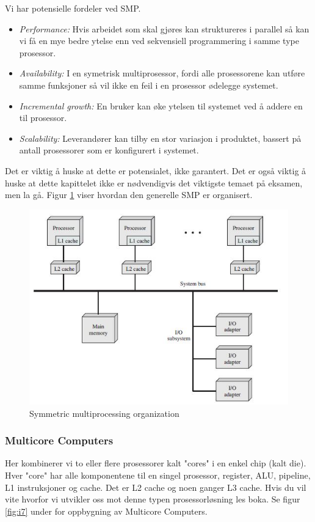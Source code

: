 Vi har potensielle fordeler ved SMP.
\begin{itemize}
\item \emph{Performance: }Hvis arbeidet som skal gjøres kan struktureres i parallel så kan vi få en mye bedre ytelse enn ved sekvensiell programmering i samme type prosessor. 
\item \emph{Availability: } I en symetrisk multiprosessor, fordi alle prosessorene kan utføre samme funksjoner så vil ikke en feil i en prosessor ødelegge systemet.
\item \emph{Incremental growth: }En bruker kan øke ytelsen til systemet ved å addere en til prosessor. 
\item \emph{Scalability: }Leverandører kan tilby en stor variasjon i produktet, bassert på antall prosessorer som er konfigurert i systemet.\newline\newline
\end{itemize}
Det er viktig å huske at dette er potensialet, ikke garantert. Det er også viktig å huske at dette kapittelet ikke er nødvendigvis det viktigste temaet på eksamen, men la gå. 
Figur \ref{fig:SMP} viser hvordan den generelle SMP er organisert. 
\begin{figure}
\centering
\includegraphics{img/SMP.JPG}
\caption{Symmetric multiprocessing organization}
\label{fig:SMP}
\end{figure}

\subsubsection{Multicore Computers}
Her kombinerer vi to eller flere prosessorer kalt "cores" i en enkel chip (kalt die). Hver "core" har alle komponentene til en singel prosessor, register, ALU, pipeline, L1 instruksjoner og cache. Det er L2 cache og noen ganger L3 cache. Hvis du vil vite hvorfor vi utvikler oss mot denne typen prosessorløsning les boka. 
Se figur \ref{fig:i7} under for oppbygning av Multicore Computers.


